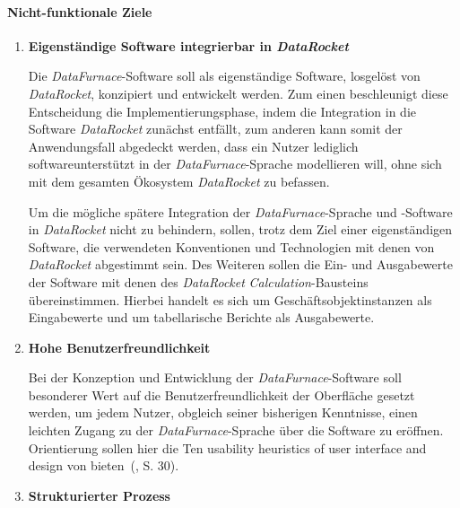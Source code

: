 \documentclass[
  language=german, %
  type=bachelor%
]{isthesis}
\begin{document}
\begin{content}
\begin{enumerate}
  \end{enumerate}

  \paragraph{Nicht-funktionale Ziele}
  \begin{enumerate}

    \item \textbf{Eigenständige Software integrierbar in \textit{DataRocket}}

      Die \textit{DataFurnace}-Software soll als eigenständige Software,
      losgelöst von \textit{DataRocket}, konzipiert und entwickelt werden. Zum
      einen beschleunigt diese Entscheidung die Implementierungsphase, indem
      die Integration in die Software \textit{DataRocket} zunächst entfällt,
      zum anderen kann somit der Anwendungsfall abgedeckt werden, dass ein Nutzer
      lediglich softwareunterstützt in der \textit{DataFurnace}-Sprache
      modellieren will, ohne sich mit dem gesamten Ökosystem
      \textit{DataRocket} zu befassen.

      Um die mögliche spätere Integration der \textit{DataFurnace}-Sprache und
      -Software in \textit{DataRocket} nicht zu behindern, sollen, trotz dem
      Ziel einer eigenständigen Software, die verwendeten Konventionen und
      Technologien mit denen von \textit{DataRocket} abgestimmt sein.  Des
      Weiteren sollen die Ein- und Ausgabewerte der Software mit denen des
      \textit{DataRocket} \textit{Calculation}-Bausteins übereinstimmen.
      Hierbei handelt es sich um Geschäftsobjektinstanzen als Eingabewerte und
      um tabellarische Berichte als Ausgabewerte.

    \item \textbf{Hohe Benutzerfreundlichkeit}

      Bei der Konzeption und Entwicklung der \textit{DataFurnace}-Software soll
      besonderer Wert auf die Benutzerfreundlichkeit der Oberfläche gesetzt
      werden, um jedem Nutzer, obgleich seiner bisherigen Kenntnisse,  einen
      leichten Zugang zu der \textit{DataFurnace}-Sprache über die Software zu
      eröffnen. Orientierung sollen hier die \glqq{}Ten usability heuristics of
      user interface and design\grqq{} von
      \textsc{\citeauthor{nielsen1994heuristic}}
      bieten~(\citeyear{nielsen1994heuristic}, S. 30).

    \item \textbf{Strukturierter Prozess}
      

\end{enumerate}
\end{content}
\end{document}
